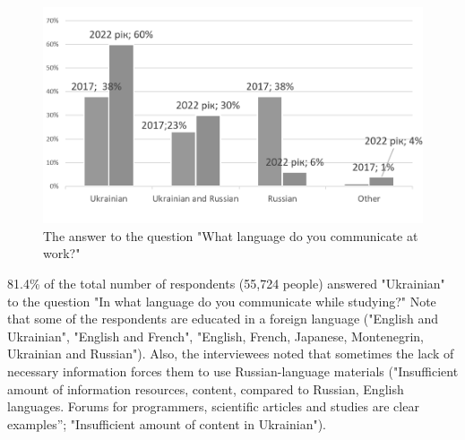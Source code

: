 \documentclass[english]{textolivre}
\begin{document}
\begin{figure}[h!]
\centering
\begin{minipage}{.7\textwidth}
 \includegraphics[width=\textwidth]{Fig5.png}
 \caption{The answer to the question "What language do you communicate at work?"}
 \label{fig5}
\end{minipage}
\end{figure}

81.4\% of the total number of respondents (55,724 people) answered "Ukrainian" to the question "In what language do you communicate while studying?" Note that some of the respondents are educated in a foreign language ("English and Ukrainian", "English and French", "English, French, Japanese, Montenegrin, Ukrainian and Russian"). Also, the interviewees noted that sometimes the lack of necessary information forces them to use Russian-language materials ("Insufficient amount of information resources, content, compared to Russian, English languages. Forums for programmers, scientific articles and studies are clear examples”; "Insufficient amount of content in Ukrainian").
\end{document}
